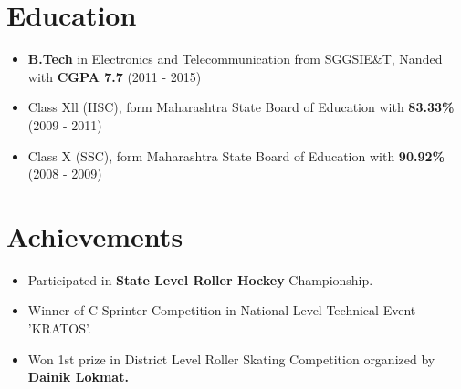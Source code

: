 \documentclass[letterpaper,11pt]{article}
\newcommand{\resumePoint}[1]{\item\small{{#1}\vspace{-4pt}}}
\newcommand{\resumeSubHeadingListStart}{\begin{itemize}[leftmargin=*]}
\newcommand{\resumeSubHeadingListEnd}{\end{itemize}}
\begin{document}

\section{Education}
  \resumeSubHeadingListStart
    \resumePoint{\textbf{B.Tech} in Electronics and Telecommunication from SGGSIE\&T, Nanded with \textbf{CGPA 7.7} (2011 - 2015)}
    \resumePoint{Class Xll (HSC), form Maharashtra State Board of Education with \textbf{83.33\%} (2009 - 2011)}
     \resumePoint{Class X (SSC), form Maharashtra State Board of Education with \textbf{90.92\%}  (2008 - 2009)}
  \resumeSubHeadingListEnd  
  

  

\section{Achievements}
  \resumeSubHeadingListStart
  	\resumePoint{Participated in \textbf{State Level Roller Hockey} Championship.}
  	\resumePoint{Winner of C Sprinter Competition in National Level Technical Event 'KRATOS'.}
  	\resumePoint{Won 1st prize in District Level Roller Skating Competition organized by \textbf{Dainik Lokmat.}}
    
  \resumeSubHeadingListEnd

  
  

\end{document}
